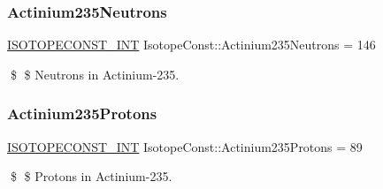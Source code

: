 \subsubsection{\texorpdfstring{Actinium235\+Neutrons}{Actinium235Neutrons}}
{\footnotesize\ttfamily \mbox{\hyperlink{group___isotope_const-_macros_ga5f18360b3e99483a35c32d789e62621c}{I\+S\+O\+T\+O\+P\+E\+C\+O\+N\+S\+T\+\_\+\+I\+NT}} Isotope\+Const\+::\+Actinium235\+Neutrons = 146}

\$ \$ Neutrons in Actinium-\/235. \mbox{\label{group___isotope_const-_actinium-_ac235_gaae6ae0de10c6becc05f5e88076d6c219}} 
\subsubsection{\texorpdfstring{Actinium235\+Protons}{Actinium235Protons}}
{\footnotesize\ttfamily \mbox{\hyperlink{group___isotope_const-_macros_ga5f18360b3e99483a35c32d789e62621c}{I\+S\+O\+T\+O\+P\+E\+C\+O\+N\+S\+T\+\_\+\+I\+NT}} Isotope\+Const\+::\+Actinium235\+Protons = 89}

\$ \$ Protons in Actinium-\/235. 